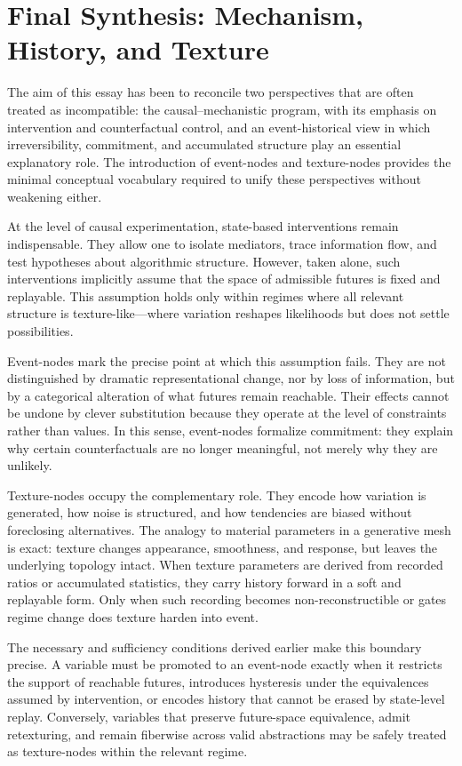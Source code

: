 \documentclass[11pt]{article}
\begin{document}
\section{Final Synthesis: Mechanism, History, and Texture}

The aim of this essay has been to reconcile two perspectives that are often
treated as incompatible: the causal–mechanistic program, with its emphasis on
intervention and counterfactual control, and an event-historical view in which
irreversibility, commitment, and accumulated structure play an essential
explanatory role. The introduction of event-nodes and texture-nodes provides the
minimal conceptual vocabulary required to unify these perspectives without
weakening either.

At the level of causal experimentation, state-based interventions remain
indispensable. They allow one to isolate mediators, trace information flow, and
test hypotheses about algorithmic structure. However, taken alone, such
interventions implicitly assume that the space of admissible futures is fixed
and replayable. This assumption holds only within regimes where all relevant
structure is texture-like—where variation reshapes likelihoods but does not
settle possibilities.

Event-nodes mark the precise point at which this assumption fails. They are not
distinguished by dramatic representational change, nor by loss of information,
but by a categorical alteration of what futures remain reachable. Their effects
cannot be undone by clever substitution because they operate at the level of
constraints rather than values. In this sense, event-nodes formalize commitment:
they explain why certain counterfactuals are no longer meaningful, not merely
why they are unlikely.

Texture-nodes occupy the complementary role. They encode how variation is
generated, how noise is structured, and how tendencies are biased without
foreclosing alternatives. The analogy to material parameters in a generative
mesh is exact: texture changes appearance, smoothness, and response, but leaves
the underlying topology intact. When texture parameters are derived from
recorded ratios or accumulated statistics, they carry history forward in a soft
and replayable form. Only when such recording becomes non-reconstructible or
gates regime change does texture harden into event.

The necessary and sufficiency conditions derived earlier make this boundary
precise. A variable must be promoted to an event-node exactly when it restricts
the support of reachable futures, introduces hysteresis under the equivalences
assumed by intervention, or encodes history that cannot be erased by state-level
replay. Conversely, variables that preserve future-space equivalence, admit
retexturing, and remain fiberwise across valid abstractions may be safely treated
as texture-nodes within the relevant regime.
\end{document}
